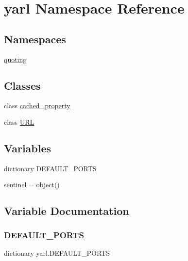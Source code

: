 \hypertarget{namespaceyarl}{}\section{yarl Namespace Reference}
\label{namespaceyarl}
\subsection*{Namespaces}
\begin{DoxyCompactItemize}
\item 
 \hyperlink{namespaceyarl_1_1quoting}{quoting}
\end{DoxyCompactItemize}
\subsection*{Classes}
\begin{DoxyCompactItemize}
\item 
class \hyperlink{classyarl_1_1cached__property}{cached\+\_\+property}
\item 
class \hyperlink{classyarl_1_1_u_r_l}{U\+RL}
\end{DoxyCompactItemize}
\subsection*{Variables}
\begin{DoxyCompactItemize}
\item 
dictionary \hyperlink{namespaceyarl_a61dad3359733748fc69c8dcd22c316b9}{D\+E\+F\+A\+U\+L\+T\+\_\+\+P\+O\+R\+TS}
\item 
\hyperlink{namespaceyarl_aa0b3b0bf74105f8136c040a3a53911f5}{sentinel} = object()
\end{DoxyCompactItemize}


\subsection{Variable Documentation}
\mbox{\label{namespaceyarl_a61dad3359733748fc69c8dcd22c316b9}} 
\subsubsection{\texorpdfstring{D\+E\+F\+A\+U\+L\+T\+\_\+\+P\+O\+R\+TS}{DEFAULT\_PORTS}}
{\footnotesize\ttfamily dictionary yarl.\+D\+E\+F\+A\+U\+L\+T\+\_\+\+P\+O\+R\+TS}

